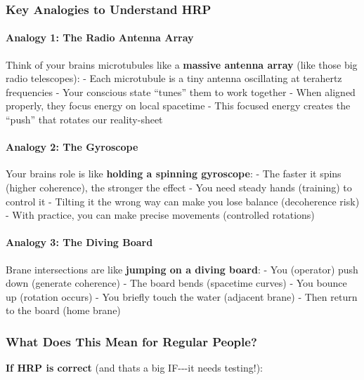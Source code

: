 \subsubsection{Key Analogies to Understand
HRP}\label{key-analogies-to-understand-hrp}

\paragraph{Analogy 1: The Radio Antenna
Array}\label{analogy-1-the-radio-antenna-array}

Think of your brain\textquotesingle s microtubules like a
\textbf{massive antenna array} (like those big radio telescopes): - Each
microtubule is a tiny antenna oscillating at terahertz frequencies -
Your conscious state ``tunes'' them to work together - When aligned
properly, they focus energy on local spacetime - This focused energy
creates the ``push'' that rotates our reality-sheet

\paragraph{Analogy 2: The Gyroscope}\label{analogy-2-the-gyroscope}

Your brain\textquotesingle s role is like \textbf{holding a spinning
gyroscope}: - The faster it spins (higher coherence), the stronger the
effect - You need steady hands (training) to control it - Tilting it the
wrong way can make you lose balance (decoherence risk) - With practice,
you can make precise movements (controlled rotations)

\paragraph{Analogy 3: The Diving
Board}\label{analogy-3-the-diving-board}

Brane intersections are like \textbf{jumping on a diving board}: - You
(operator) push down (generate coherence) - The board bends (spacetime
curves) - You bounce up (rotation occurs) - You briefly touch the water
(adjacent brane) - Then return to the board (home brane)

\subsubsection{What Does This Mean for Regular
People?}\label{what-does-this-mean-for-regular-people}

\textbf{If HRP is correct} (and that\textquotesingle s a big IF-\/-\/-it
needs testing!):

